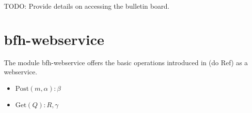 \documentclass[oneside]{scrreprt}
\newcommand{\fig}[1]{Figure~\ref{#1}}
\begin{document}
TODO: Provide details on accessing the bulletin board.

\section{bfh-webservice}
The module bfh-webservice offers the basic operations introduced in (do Ref) as a webservice.
\begin{itemize}
	\item $\mathrm{Post}(m,\alpha):\beta$
	\item $\mathrm{Get}(Q):R, \gamma$
\end{itemize}

%
%
%
%
%
%
%
%
\end{document}
